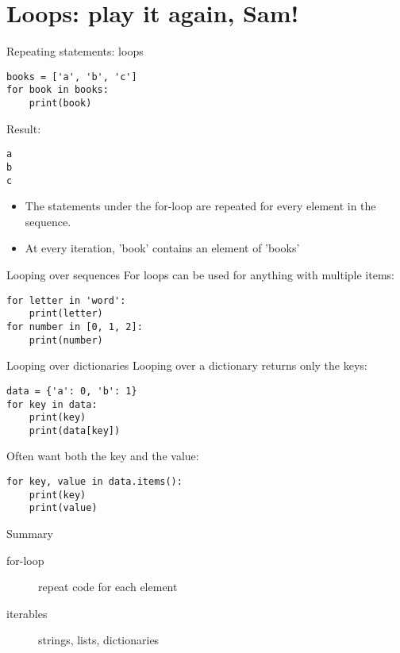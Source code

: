 \documentclass[aspectratio=169,usenames,dvipsnames]{beamer}
\begin{document}
\section{Loops: play it again, Sam!}
\frame{\tableofcontents[currentsection]}

\begin{frame}[fragile]{Repeating statements: loops}
\begin{lstlisting}
books = ['a', 'b', 'c']
for book in books:
    print(book)
\end{lstlisting}
Result:
\begin{lstlisting}
a
b
c
\end{lstlisting}

\begin{itemize}
\item The statements under the for-loop are repeated
    for every element in the sequence.
\item At every iteration, 'book' contains an element of 'books'
\end{itemize}
\end{frame}

\begin{frame}[fragile]{Looping over sequences}
For loops can be used for anything with multiple items:
\begin{lstlisting}
for letter in 'word':
    print(letter)
for number in [0, 1, 2]:
    print(number)
\end{lstlisting}
\end{frame}

\begin{frame}[fragile]{Looping over dictionaries}
Looping over a dictionary returns only the keys:
\begin{lstlisting}
data = {'a': 0, 'b': 1}
for key in data:
    print(key)
    print(data[key])
\end{lstlisting}

\pause
Often want both the key and the value:
\begin{lstlisting}
for key, value in data.items():
    print(key)
    print(value)
\end{lstlisting}
\end{frame}

\begin{frame}{Summary}
    \begin{description}
        \item[for-loop] repeat code for each element
        \item[iterables] strings, lists, dictionaries
    \end{description}
\end{frame}
\end{document}

